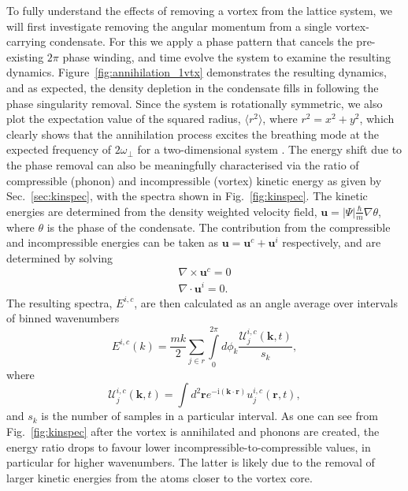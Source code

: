 To fully understand the effects of removing a vortex from the lattice system, we will first investigate removing the angular momentum from a single vortex-carrying condensate. For this we apply a phase pattern that cancels the pre-existing $2\pi$ phase winding, and time evolve the system to examine the resulting dynamics. Figure~\ref{fig:annihilation_1vtx} demonstrates the resulting dynamics, and as expected, the density depletion in the condensate fills in following the phase singularity removal. Since the system is rotationally symmetric, we also plot the expectation value of the squared radius, $\langle r^2 \rangle$, where $r^2 = x^2 + y^2$, which clearly shows that the annihilation process excites the breathing mode at the expected frequency of $2\omega_\perp$ for a two-dimensional system \cite{BEC:Pitaevskii_pra_1997}. The energy shift due to the phase removal can also be meaningfully characterised via the ratio of compressible (phonon) and incompressible (vortex) kinetic energy as given by Sec.~\ref{sec:kinspec}, with the spectra shown in Fig.~\ref{fig:kinspec}. The kinetic energies are determined from the density weighted velocity field, $\mathbf{u} = |\Psi|\frac{\hbar}{m}\nabla \theta$, where $\theta$ is the phase of the condensate. The contribution from the compressible and incompressible energies can be taken as $\mathbf{u} = \mathbf{u}^{c} + \mathbf{u}^{i}$ respectively, and are determined by solving
\begin{subequations}
    \begin{align}
        \nabla \times \mathbf{u}^{c} = 0 \\
        \nabla \cdot \mathbf{u}^{i} = 0.
    \end{align}
\end{subequations}
The resulting spectra, $E^{i,c}$, are then calculated as an angle average over intervals of binned wavenumbers \cite{CT:Bradley_prx_2012}
\begin{equation}
    E^{i,c}(k) = \frac{mk}{2}\displaystyle\sum_{j\in r}\int\limits_{0}^{2\pi} d\phi_k \frac{\mathcal{U}^{i,c}_j(\mathbf{k},t)}{s_k},
\end{equation}
where
\begin{equation}
    \mathcal{U}^{i,c}_{j}(\mathbf{k},t) = \int d^2\mathbf{r}e^{-\text{i}(\mathbf{k}\cdot \mathbf{r})}u_j^{i,c}(\mathbf{r},t),
\end{equation}
and $s_k$ is the number of samples in a particular interval. As one can see from Fig.~\ref{fig:kinspec} after the vortex is annihilated and phonons are created, the energy ratio drops to favour lower incompressible-to-compressible values, in particular for higher wavenumbers. The latter is likely due to the removal of larger kinetic energies from the atoms closer to the vortex core.


